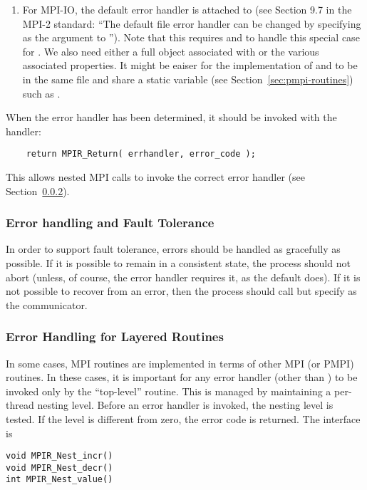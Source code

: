 \documentclass{article}
\begin{document}
\begin{enumerate}
\item For MPI-IO, the default error handler is attached to
   (see Section 9.7 in the MPI-2 standard: ``The default
  file error handler can be changed by specifying  as the
   argument to '').  Note that this
  requires  and
   to handle this special case for
  .  We also need either a full
   object associated with  or
  the various associated properties.  It might be eaiser for the
  implementation of  and
   to be in the same file and share a
  static variable (see Section~\ref{sec:pmpi-routines}) such as
  . 
\end{enumerate}

When the error handler has been determined, it should be invoked with the
 handler:
\begin{verbatim}
    return MPIR_Return( errhandler, error_code );
\end{verbatim}
This allows nested MPI calls to invoke the correct error handler (see
Section~\ref{sec:err-handling-nested}).  

\subsubsection{Error handling and Fault Tolerance}
\label{sec:errs-and-faults}
In order to support fault tolerance, errors should be handled as
gracefully as possible.  If it is possible to remain in a consistent
state, the process should not abort (unless, of course, the error
handler requires it, as the default  does).  
If it is not possible to recover from an error, then the process
should call  but specify  as the
communicator.  

\subsubsection{Error Handling for Layered Routines}
\label{sec:err-handling-nested}
In some cases, MPI routines are implemented in terms of other MPI (or
PMPI) routines.  In these cases, it is important for any error handler
(other than ) to be invoked only by the
``top-level'' routine.  
This is managed by maintaining a per-thread nesting level.  Before an error
handler is invoked, the nesting level is tested.  If the level is different
from zero, the error code is returned.  The interface is
\begin{verbatim}
void MPIR_Nest_incr()
void MPIR_Nest_decr()
int MPIR_Nest_value()
\end{verbatim}
\end{document}
